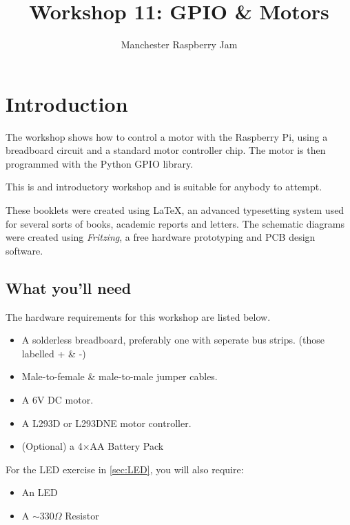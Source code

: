 \documentclass[a4paper, twocolumn, twoside, 11pt]{article}
\begin{document}
	\author{Manchester Raspberry Jam}
	\title{Workshop 11: GPIO \& Motors}
	\date{}

	\maketitle
	
	\setcounter{tocdepth}{1}
	\tableofcontents
	
	\setcounter{section}{-1}
	\section{Introduction}
	
		The workshop shows how to control a motor with the Raspberry Pi, using a breadboard circuit and a standard motor controller chip. The motor is then programmed with the Python GPIO library.

		This is and introductory workshop and is suitable for anybody to attempt.
		
		These booklets were created using {\selectfont \LaTeX}, an advanced typesetting system used for several sorts of books, academic reports and letters. The schematic diagrams were created using \textit{Fritzing}, a free hardware prototyping and PCB design software.
	
		\subsection*{What you'll need}
			
			The hardware requirements for this workshop are listed below. %
	
			\begin{itemize}[noitemsep]		
				\item A solderless breadboard, preferably one with seperate bus strips. (those labelled + \& -)
				\item Male-to-female \& male-to-male jumper cables.
				\item A 6V DC motor.
				\item A L293D or L293DNE motor controller.
				\item (Optional) a 4$\times$AA Battery Pack				
			\end{itemize}
			
			For the LED exercise in \autoref{sec:LED}, you will also require:
			
			\begin{itemize}[noitemsep]	
				\item An LED
				\item A $\sim 330 \Omega$ Resistor
			\end{itemize}
			
\end{document}
